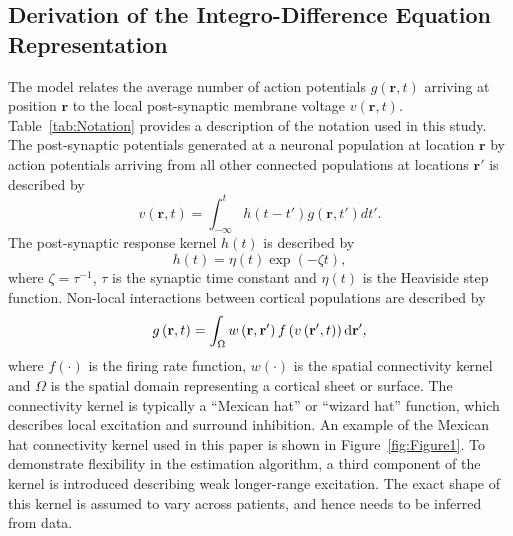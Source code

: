 \documentclass[12pt]{iopart}
\begin{document}
\subsection{Derivation of the Integro-Difference Equation Representation}
The model relates the average number of action potentials $g(\mathbf{r},t)$ arriving at position $\mathbf{r}$ to the local post-synaptic membrane voltage $v(\mathbf{r},t)$. Table~\ref{tab:Notation} provides a description of the notation used in this study. The post-synaptic potentials generated at a neuronal population at location $\mathbf{r}$ by action potentials arriving from all other connected populations at locations $\mathbf{r}'$ is described by 
\begin{equation}
	\label{SpikesToPotential} v\left( {\mathbf{r},t} \right) = \int_{ - \infty }^t {h\left( {t - t'} \right)g\left( {\mathbf{r},t'} \right)dt'}. 
\end{equation}
The post-synaptic response kernel $h(t)$ is described by 
\begin{equation}
	\label{SynapticRespKernel} h(t) = \eta(t)\exp{\left(-\zeta t\right)}, 
\end{equation}
where $\zeta=\tau^{-1}$, $\tau$ is the synaptic time constant and $\eta(t)$ is the Heaviside step function. Non-local interactions between cortical populations are described by 
\begin{equation}
	\label{RateBasedInteractions} g\left( \mathbf{r},t \right) = \int_\Omega {w\left( \mathbf{r},\mathbf{r}' \right)f\left( v\left( \mathbf{r}',t \right) \right)\rm{d}\mathbf{r}'}, 
\end{equation}
where $f(\cdot)$ is the firing rate function, $w(\cdot)$ is the spatial connectivity kernel and $\Omega$ is the spatial domain representing a cortical sheet or surface. The connectivity kernel is typically a ``Mexican hat'' or ``wizard hat'' function, which describes local excitation and surround inhibition. An example of the Mexican hat connectivity kernel used in this paper is shown in Figure~\ref{fig:Figure1}. To demonstrate flexibility in the estimation algorithm, a third component of the kernel is introduced describing weak longer-range excitation. The exact shape of this kernel is assumed to vary across patients, and hence needs to be inferred from data.
\end{document}
